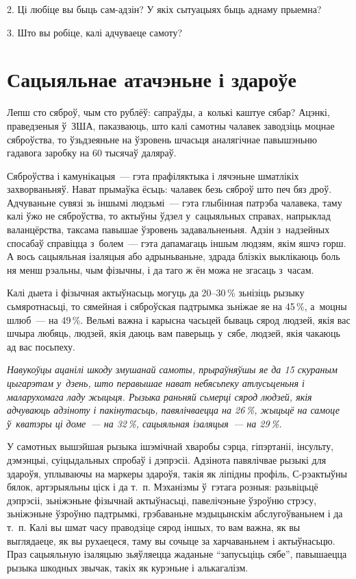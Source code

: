 2. Ці любіце вы быць сам-адзін? У якіх сытуацыях быць аднаму прыемна?

3. Што вы робіце, калі адчуваеце самоту?


\section{Сацыяльнае атачэньне і здароўе}

Лепш сто сяброў, чым сто рублёў: сапраўды, а~колькі каштуе сябар? Ацэнкі, праведзеныя ў~ЗША, паказваюць, што калі самотны чалавек заводзіць моцнае сяброўства, то ўзьдзеяньне на ўзровень шчасьця аналягічнае павышэньню гадавога заробку на 60 тысячаў даляраў.

Сяброўства і камунікацыя~--- гэта прафіляктыка і лячэньне шматлікіх захворваньняў. Нават прымаўка ёсьць: чалавек безь сяброў што печ бяз дроў. Адчуваньне сувязі зь іншымі людзьмі~--- гэта глыбінная патрэба чалавека, таму калі ўжо не сяброўства, то актыўны ўдзел у~сацыяльных справах, напрыклад валанцёрства, таксама павышае ўзровень задавальненьня. Адзін з~надзейных спосабаў справіцца з~болем~--- гэта дапамагаць іншым людзям, якім яшчэ горш. А вось сацыяльная ізаляцыя або адрыньваньне, здрада блізкіх выклікаюць боль ня менш рэальны, чым фізычны, і да таго ж ён можа не згасаць з~часам.

Калі дыета і фізычная актыўнасьць могуць да 20--30\,\% зьнізіць рызыку сьмяротнасьці, то сямейная і сяброўская падтрымка зьніжае яе на 45\,\%, а~моцны шлюб~--- на 49\,\%. Вельмі важна і карысна часьцей бываць сярод людзей, якія вас шчыра любяць, людзей, якія даюць вам паверыць у~сябе, людзей, якія чакаюць ад вас посьпеху.

\emph{Навукоўцы ацанілі шкоду змушанай самоты, прыраўняўшы яе да 15 скураным цыгарэтам у~дзень, што перавышае нават небясьпеку атлусьценьня і маларухомага ладу жыцьця. Рызыка раньняй сьмерці сярод людзей, якія адчуваюць адзіноту і пакінутасьць, павялічваецца на 26\,\%, жыцьцё на самоце ў~кватэры ці доме~--- на 32\,\%, сацыяльная ізаляцыя~--- на 29\,\%.}


У самотных вышэйшая рызыка ішэмічнай хваробы сэрца, гіпэртаніі, інсульту, дэмэнцыі, суіцыдальных спробаў і дэпрэсіі. Адзінота павялічвае рызыкі для здароўя, уплываючы на маркеры здароўя, такія як ліпідны профіль, С-рэактыўны бялок, артэрыяльны ціск і да т.~п. Мэханізмы ў~гэтага розныя: разьвіцьцё дэпрэсіі, зьніжэньне фізычнай актыўнасьці, павелічэньне ўзроўню стрэсу, зьніжэньне ўзроўню падтрымкі, грэбаваньне мэдыцынскім абслугоўваньнем і да т.~п. Калі вы шмат часу праводзіце сярод іншых, то вам важна, як вы выглядаеце, як вы рухаецеся, таму вы сочыце за харчаваньнем і актыўнасьцю. Праз сацыяльную ізаляцыю зьяўляецца жаданьне ``запусьціць сябе'', павышаецца рызыка шкодных звычак, такіх як курэньне і алькагалізм.

